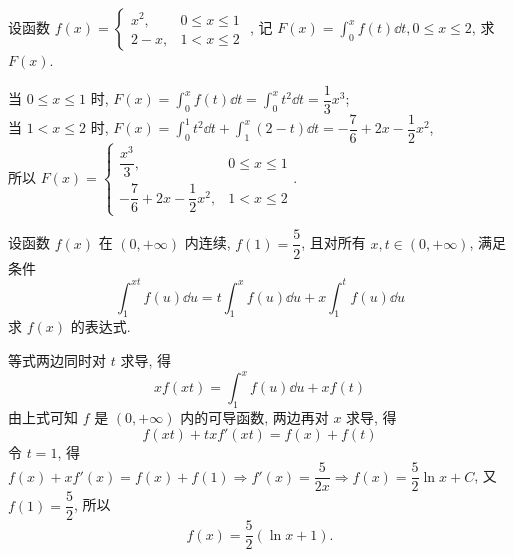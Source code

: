 \begin{example}
    设函数 $ f(x)=\begin{cases}x^{2} ,&0 \leqslant x \leqslant 1 \\ 2-x ,&1<x \leqslant 2\end{cases} $ , 记
    $\displaystyle F(x)=\int_{0}^{x} f(t) \dd t, 0 \leqslant x \leqslant 2$, 求 $F(x).$
\end{example}
\begin{solution}
    当 $0\leqslant x\leqslant 1$ 时, $\displaystyle F(x)=\int_{0}^{x}f(t)\dd t=\int_{0}^{x}t^2\dd t=\dfrac{1}{3}x^3$;\\
    当 $1< x\leqslant 2$ 时, $\displaystyle F(x)=\int_{0}^{1}t^2\dd t+\int_{1}^{x}(2-t)\dd t=-\dfrac{7}{6}+2x-\dfrac{1}{2}x^2$, \\
    所以 $\displaystyle F(x)=\begin{cases}\dfrac{x^3}{3} ,&0 \leqslant x \leqslant 1 \\[6pt] -\dfrac{7}{6}+2x-\dfrac{1}{2}x^2 ,&1<x \leqslant 2\end{cases}.$
\end{solution}

\begin{example}
    设函数 $ f(x) $ 在 $ (0,+\infty) $ 内连续, $ f(1)=\dfrac{5}{2} $, 且对所有 $ x, t \in(0,+\infty) $, 满足条件
    $$\int_{1}^{x t} f(u) \dd u=t \int_{1}^{x} f(u) \dd u+x \int_{1}^{t} f(u) \dd u $$
    求 $ f(x) $ 的表达式.
\end{example}
\begin{solution}
    等式两边同时对 $t$ 求导, 得
    $$xf( xt) =\int _{1}^{x}f( u) \dd u+xf( t) $$
    由上式可知 $f$ 是 $(0,+\infty)$ 内的可导函数, 两边再对 $x$ 求导, 得
    $$f(xt)+txf'(xt)=f(x)+f(t)$$
    令 $t=1$, 得 $f(x)+xf'(x)=f(x)+f(1)\Rightarrow f'(x)=\dfrac{5}{2x}\Rightarrow f(x)=\dfrac{5}{2}\ln x+C$,
    又 $f(1)=\dfrac{5}{2}$, 所以 $$f(x)=\dfrac{5}{2}(\ln x+1).$$
\end{solution}

